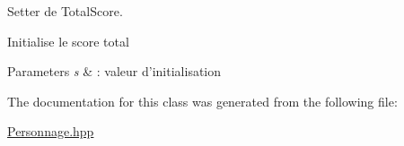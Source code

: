 Setter de Total\+Score. 

Initialise le score total


\begin{DoxyParams}{Parameters}
{\em s} & \+: valeur d'initialisation \\
\hline
\end{DoxyParams}


The documentation for this class was generated from the following file\+:\begin{DoxyCompactItemize}
\item 
\hyperlink{_personnage_8hpp}{Personnage.\+hpp}\end{DoxyCompactItemize}
